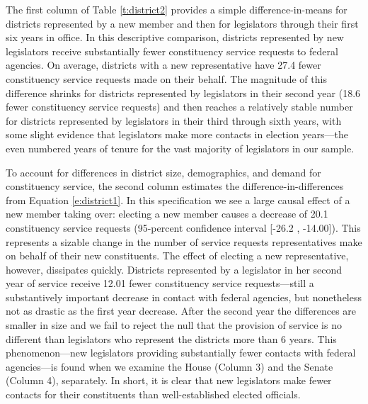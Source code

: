 \documentclass{article}
\begin{document}
The first column of Table \ref{t:district2} provides a simple difference-in-means for districts represented by a new member and then for legislators through their first six years in office.  In this descriptive comparison, districts represented by new legislators receive substantially fewer constituency service requests to federal agencies.  On average, districts with a new representative have 27.4 fewer constituency service requests made on their behalf.  The magnitude of this difference shrinks for districts represented by legislators in their second year (18.6 fewer constituency service requests) and then reaches a relatively stable number for districts represented by legislators in their third through sixth years, with some slight evidence that legislators make more contacts in election years---the even numbered years of tenure for the vast majority of legislators in our sample. 



\begin{table}[hbt!]
\caption{The Effect of New Members on Number of Requests at the District Level} \label{t:district2}
\begin{minipage}{\textwidth}
\begin{center}

\end{center}
\end{minipage}
\end{table}


To account for differences in district size, demographics, and demand for constituency service, the second column estimates the difference-in-differences from Equation \ref{e:district1}.  In this specification we see a large causal effect of a new member taking over: electing a new member causes a decrease of 20.1 constituency service requests (95-percent confidence interval [-26.2 , -14.00]).  This represents a sizable change in the number of service requests representatives make on behalf of their new constituents.  The effect of electing a new representative, however, dissipates quickly. Districts represented by a legislator in her second year of service receive 12.01 fewer constituency service requests---still a substantively important decrease in contact with federal agencies, but nonetheless not as drastic as the first year decrease.  After the second year the differences are smaller in size and we fail to reject the null that the provision of service is no different than legislators who represent the districts more than 6 years.  This phenomenon---new legislators providing substantially fewer contacts with federal agencies---is found when we examine the House (Column 3) and the Senate (Column 4), separately.  In short, it is clear that new legislators make fewer contacts for their constituents than well-established elected officials.   
\end{document}
